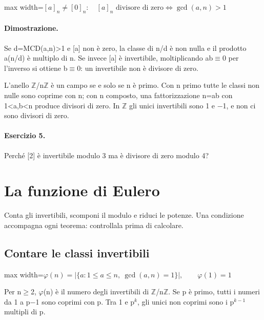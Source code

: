 \documentclass[a4paper,11pt]{article}
\begin{document}
\begin{center}\begin{adjustbox}{max width=\linewidth}$\displaystyle [a]_n\ne[0]_n:\quad[a]_n\text{ divisore di zero}\iff\gcd(a,n)>1$\end{adjustbox}\end{center}

\paragraph{Dimostrazione.} Se d=MCD(a,n)>1 e [a] non è zero, la classe di n/d è non nulla e il prodotto a(n/d) è multiplo di n. Se invece [a] è invertibile, moltiplicando ab$\equiv$0 per l’inverso si ottiene b$\equiv$0: un invertibile non è divisore di zero.

L’anello $\mathbb Z$/n$\mathbb Z$ è un campo se e solo se n è primo. Con n primo tutte le classi non nulle sono coprime con n; con n composto, una fattorizzazione n=ab con 1<a,b<n produce divisori di zero. In $\mathbb Z$ gli unici invertibili sono 1 e $-$1, e non ci sono divisori di zero.

\paragraph{Esercizio 5.} Perché [2] è invertibile modulo 3 ma è divisore di zero modulo 4?

\section{La funzione di Eulero}

Conta gli invertibili, scomponi il modulo e riduci le potenze. Una condizione accompagna ogni teorema: controllala prima di calcolare.

\subsection{Contare le classi invertibili}

\begin{center}\begin{adjustbox}{max width=\linewidth}$\displaystyle \varphi(n)=|\{a:1\le a\le n,\ \gcd(a,n)=1\}|,\qquad\varphi(1)=1$\end{adjustbox}\end{center}

Per n$\ge$2, $\varphi$(n) è il numero degli invertibili di $\mathbb Z$/n$\mathbb Z$. Se p è primo, tutti i numeri da 1 a p$-$1 sono coprimi con p. Tra 1 e p$^{k}$, gli unici non coprimi sono i p$^{k-1}$ multipli di p.
\end{document}
